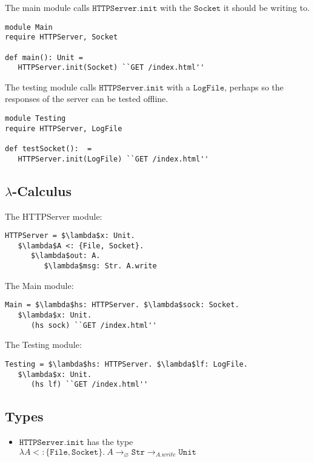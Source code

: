 \documentclass{llncs}
\newcommand{\keywadj}[1]{\mathtt{#1}}
\newcommand{\kwa}[1]{\keywadj{ #1 }}
\newcommand{\Unit}[0]{ \kwa{Unit} }
\begin{document}
\noindent
The main module calls $\kwa{HTTPServer.init}$ with the $\kwa{Socket}$ it should be writing to.

\begin{lstlisting}
module Main
require HTTPServer, Socket

def main(): Unit =
   HTTPServer.init(Socket) ``GET /index.html''
\end{lstlisting}

\noindent
The testing module calls $\kwa{HTTPServer.init}$ with a $\kwa{LogFile}$, perhaps so the responses of the server can be tested offline.

\begin{lstlisting}
module Testing
require HTTPServer, LogFile

def testSocket():  =
   HTTPServer.init(LogFile) ``GET /index.html''
\end{lstlisting}


\subsection*{$\lambda$-Calculus}

\noindent
The HTTPServer module:
\begin{lstlisting}
HTTPServer = $\lambda$x: Unit.
   $\lambda$A <: {File, Socket}.
      $\lambda$out: A.
         $\lambda$msg: Str. A.write
\end{lstlisting}

\noindent
The Main module:

\begin{lstlisting}
Main = $\lambda$hs: HTTPServer. $\lambda$sock: Socket.
   $\lambda$x: Unit.
      (hs sock) ``GET /index.html''
\end{lstlisting}

\noindent
The Testing module:

\begin{lstlisting}
Testing = $\lambda$hs: HTTPServer. $\lambda$lf: LogFile.
   $\lambda$x: Unit.
      (hs lf) ``GET /index.html''
\end{lstlisting}

\subsection*{Types}

\begin{itemize}
	\item $\kwa{HTTPServer.init}$ has the type $\lambda A <: \{ \kwa{File, Socket} \}.~A \rightarrow_{\varnothing} \kwa{Str} \rightarrow_{A.write} \Unit$
\end{itemize}


\end{document}

